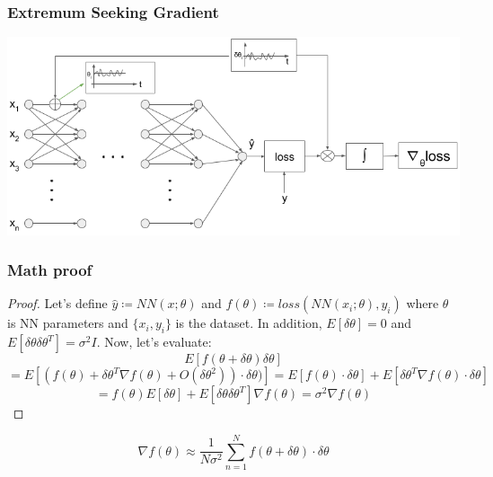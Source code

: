 \documentclass[
	11pt, %
]{beamer}
\begin{document}


\begin{frame}
  \frametitle{Extremum Seeking Gradient}
  \includegraphics[width=\columnwidth]{../report/images/ESG-scheme.png}
\end{frame}




\begin{frame}
  \frametitle{Math proof}
  \begin{proof}
    Let's define $\hat{y} \coloneqq NN(x;\theta)$ and $f(\theta) \coloneqq loss(NN(x_{i};\theta),y_{i})$
    where $\theta$ is NN parameters and $\{x_{i},y_{i}\}$ is the dataset. In addition, $E[\delta\theta] = 0$ and $E[\delta\theta \delta\theta^{T}]=\sigma^{2}I$. \newline
    Now, let's evaluate:
    $$E[f(\theta+\delta\theta)\delta\theta]$$
    $$=E[(f(\theta)+\delta\theta^{T} \nabla f(\theta)+O(\delta\theta^{2}))\cdot \delta\theta)] = E[f(\theta)\cdot \delta\theta]+E[\delta\theta^{T} \nabla f(\theta)\cdot \delta\theta]$$
    $$=f(\theta)E[\delta\theta]+E[\delta\theta \delta\theta^{T}] \nabla f(\theta) = \sigma^{2} \nabla f(\theta)$$ 
 \end{proof}


\begin{theorem}[ESG]
$$\nabla f(\theta) \approx \frac{1}{N\sigma^{2}}\sum^{N}_{n=1} f(\theta+\delta\theta)\cdot \delta\theta$$
\end{theorem}



\end{frame}

\end{document}
